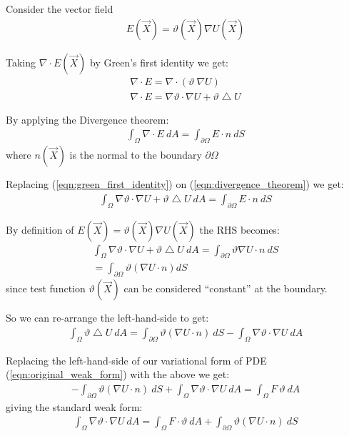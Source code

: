 \documentclass{birkjour}
\numberwithin{equation}{section}
\begin{document}
Consider the vector field
\begin{eqnarray}
	E(\vec X) = \vartheta(\vec X) \nabla U(\vec X)
\end{eqnarray}
 
Taking $\nabla \cdot E(\vec X)$ by Green's first identity we get:
\begin{eqnarray}
	\label{eqn:green_first_identity}
	\nabla \cdot E = \nabla \cdot (\vartheta \ \nabla U) \nonumber\\
	\nabla \cdot E = \nabla \vartheta \cdot \nabla U + \vartheta \bigtriangleup U
\end{eqnarray} 

By applying the Divergence theorem:
\begin{eqnarray}
	\label{eqn:divergence_theorem}
	\int_{\Omega} {\nabla \cdot E \ dA} = \int_{\partial \Omega} { E \cdot n  \ dS }
\end{eqnarray}
where $n(\vec X)$ is the normal to the boundary $\partial \Omega$

Replacing (\ref{eqn:green_first_identity}) on (\ref{eqn:divergence_theorem}) we get:
\begin{eqnarray}
	\int_{\Omega}{ \nabla \vartheta \cdot \nabla U + \vartheta \bigtriangleup U  \ dA} = \int_{\partial \Omega} {  E \cdot n  \ dS } \nonumber
\end{eqnarray}

By definition of $E(\vec X) = \vartheta(\vec X) \nabla U(\vec X)$ the RHS becomes:
\begin{eqnarray}
	\int_{\Omega}{ \nabla \vartheta \cdot \nabla U + \vartheta \bigtriangleup U  \ dA} = \int_{\partial \Omega} { \vartheta \nabla U \cdot n  \ dS } \nonumber \\
	= \int_{\partial \Omega} { \vartheta \left( \nabla U \cdot n\right) dS }
\end{eqnarray}
since test function $\vartheta(\vec X)$ can be considered ``constant'' at the boundary.

So we can re-arrange the left-hand-side to get:
\begin{eqnarray}
	\int_{\Omega}{\vartheta \bigtriangleup U  \ dA} = \int_{\partial \Omega} { \vartheta \left( \nabla U \cdot n\right)  \ dS } - \int_{\Omega}{ \nabla \vartheta \cdot \nabla U  \ dA}
\end{eqnarray}

Replacing the left-hand-side of our variational form of PDE (\ref{eqn:original_weak_form}) with the above we get:
 \begin{eqnarray}
	-\int_{\partial \Omega} { \vartheta \left( \nabla U \cdot n \right)  \ dS } + \int_{\Omega}{ \nabla \vartheta \cdot \nabla U  \ dA} = \int_{\Omega} { F \ \vartheta  \ dA }
\end{eqnarray}
giving the standard weak form:
\begin{eqnarray}
	\label{eqn:standard_weak_form}
	\int_{\Omega}{ \nabla \vartheta \cdot \nabla U  \ dA} = \int_{\Omega} { F \cdot \vartheta  \ dA } + \int_{\partial \Omega} { \vartheta \left( \nabla U \cdot n\right)  \ dS }
\end{eqnarray}
\end{document}
